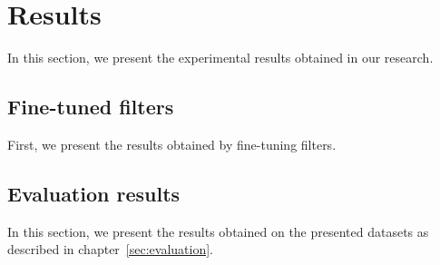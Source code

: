 
\chapter{Results}
In this section, we present the experimental results obtained in our
research.

\section{Fine-tuned filters}
First, we present the results obtained by fine-tuning filters.

\section{Evaluation results}
In this section, we present the results obtained on the presented datasets
as described in chapter~\ref{sec:evaluation}.
